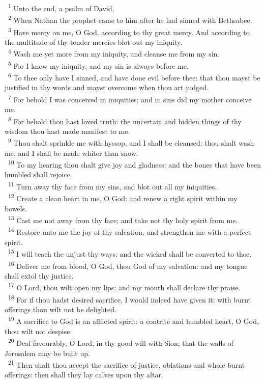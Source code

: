 \documentclass[a5paper,12pt]{article}
\begin{document}
\begin{multicols*}{2}
~\textsuperscript{1} Unto the end, a psalm of David,\\
~\textsuperscript{2} When Nathan the prophet came to him after he had sinned with Bethsabee.\\
~\textsuperscript{3} Have mercy on me, O God, according to thy great mercy. And according to the multitude of thy tender mercies blot out my iniquity.\\
~\textsuperscript{4} Wash me yet more from my iniquity, and cleanse me from my sin.\\
~\textsuperscript{5} For I know my iniquity, and my sin is always before me.\\
~\textsuperscript{6} To thee only have I sinned, and have done evil before thee: that thou mayst be justified in thy words and mayst overcome when thou art judged.\\
~\textsuperscript{7} For behold I was conceived in iniquities; and in sins did my mother conceive me.\\
~\textsuperscript{8} For behold thou hast loved truth: the uncertain and hidden things of thy wisdom thou hast made manifest to me.\\
~\textsuperscript{9} Thou shalt sprinkle me with hyssop, and I shall be cleansed: thou shalt wash me, and I shall be made whiter than snow.\\
~\textsuperscript{10} To my hearing thou shalt give joy and gladness: and the bones that have been humbled shall rejoice.\\
~\textsuperscript{11} Turn away thy face from my sins, and blot out all my iniquities.\\
~\textsuperscript{12} Create a clean heart in me, O God: and renew a right spirit within my bowels.\\
~\textsuperscript{13} Cast me not away from thy face; and take not thy holy spirit from me.\\
~\textsuperscript{14} Restore unto me the joy of thy salvation, and strengthen me with a perfect spirit.\\
~\textsuperscript{15} I will teach the unjust thy ways: and the wicked shall be converted to thee.\\
~\textsuperscript{16} Deliver me from blood, O God, thou God of my salvation: and my tongue shall extol thy justice.\\
~\textsuperscript{17} O Lord, thou wilt open my lips: and my mouth shall declare thy praise.\\
~\textsuperscript{18} For if thou hadst desired sacrifice, I would indeed have given it: with burnt offerings thou wilt not be delighted.\\
~\textsuperscript{19} A sacrifice to God is an afflicted spirit: a contrite and humbled heart, O God, thou wilt not despise.\\
~\textsuperscript{20} Deal favourably, O Lord, in thy good will with Sion; that the walls of Jerusalem may be built up.\\
~\textsuperscript{21} Then shalt thou accept the sacrifice of justice, oblations and whole burnt offerings: then shall they lay calves upon thy altar.\\


\end{multicols*}
\end{document}
